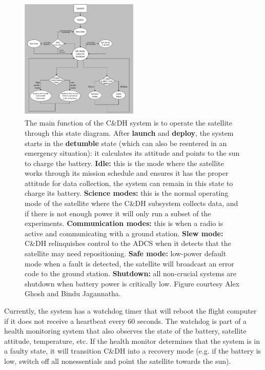 \begin{figure}
  \centering
  \includegraphics[width=0.5\textwidth]{images/state_machine}
  \caption{The main function of the C\&DH system is to operate the satellite
  through this state diagram. After \textbf{launch} and \textbf{deploy}, the
  system starts in the \textbf{detumble} state (which can also be reentered in
  an emergency situation): it calculates its attitude and points to the sun to
  charge the battery.  \textbf{Idle:} this is the mode where the satellite works
  through its mission schedule and ensures it has the proper attitude for data
  collection, the system can remain in this state to charge its battery.
  \textbf{Science modes:} this is the normal operating mode of the satellite
  where the C\&DH subsystem collects data, and if there is not enough power it
  will only run a subset of the experiments.  \textbf{Communication modes:} this
  is when a radio is active and communicating with a ground station.
  \textbf{Slew mode:} C\&DH relinquishes control to the ADCS when it detects
  that the satellite may need repositioning.  \textbf{Safe mode:} low-power
  default mode when a fault is detected, the satellite will broadcast an error
  code to the ground station.  \textbf{Shutdown:} all non-crucial systems are
  shutdown when battery power is critically low. Figure courtesy Alex Ghosh and
  Bindu Jagannatha. }\label{fig:state_machine}
\end{figure}

Currently, the system has a watchdog timer that will reboot the flight computer
if it does not receive a heartbeat every 60 seconds.  The watchdog is part of a
health monitoring system that also observes the state of the battery, satellite
attitude, temperature, etc. If the health monitor determines that the system is
in a faulty state, it will transition C\&DH into a recovery mode (e.g. if the
battery is low, switch off all nonessentials and point the satellite towards the
sun).

